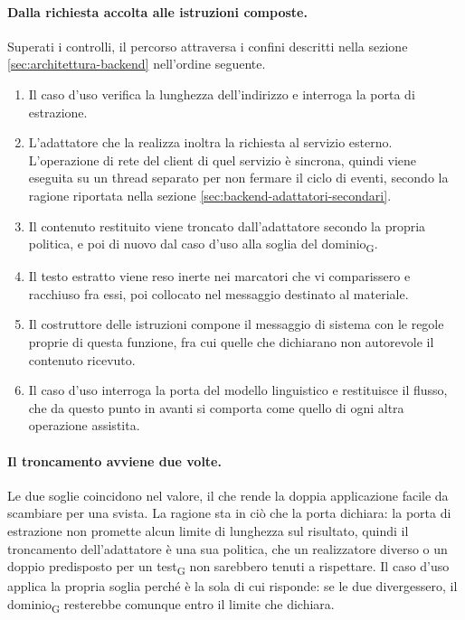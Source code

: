 \documentclass[a4paper, 10pt]{article}
\begin{document}
\paragraph{Dalla richiesta accolta alle istruzioni composte.}
Superati i controlli, il percorso attraversa i confini descritti nella sezione \ref{sec:architettura-backend} nell'ordine seguente.

\begin{enumerate}
    \setlength{\itemsep}{3pt}
    \item Il caso d'uso verifica la lunghezza dell'indirizzo e interroga la porta di estrazione.
    \item L'adattatore che la realizza inoltra la richiesta al servizio esterno. L'operazione di rete del client di quel servizio è sincrona, quindi viene eseguita su un thread separato per non fermare il ciclo di eventi, secondo la ragione riportata nella sezione \ref{sec:backend-adattatori-secondari}.
    \item Il contenuto restituito viene troncato dall'adattatore secondo la propria politica, e poi di nuovo dal caso d'uso alla soglia del dominio\textsubscript{G}.
    \item Il testo estratto viene reso inerte nei marcatori che vi comparissero e racchiuso fra essi, poi collocato nel messaggio destinato al materiale.
    \item Il costruttore delle istruzioni compone il messaggio di sistema con le regole proprie di questa funzione, fra cui quelle che dichiarano non autorevole il contenuto ricevuto.
    \item Il caso d'uso interroga la porta del modello linguistico e restituisce il flusso, che da questo punto in avanti si comporta come quello di ogni altra operazione assistita.
\end{enumerate}

\paragraph{Il troncamento avviene due volte.}
Le due soglie coincidono nel valore, il che rende la doppia applicazione facile da scambiare per una svista. La ragione sta in ciò che la porta dichiara: la porta di estrazione non promette alcun limite di lunghezza sul risultato, quindi il troncamento dell'adattatore è una sua politica, che un realizzatore diverso o un doppio predisposto per un test\textsubscript{G} non sarebbero tenuti a rispettare. Il caso d'uso applica la propria soglia perché è la sola di cui risponde: se le due divergessero, il dominio\textsubscript{G} resterebbe comunque entro il limite che dichiara.
\end{document}
